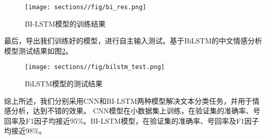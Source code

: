 \begin{figure}[H]
    \centering
    \texttt{[image: sections//fig/bi\_res.png]}
    \caption{BI-LSTM模型的训练结果}
    \label{fig:bires}
\end{figure}

最后，导出我们训练好的模型，进行自主输入测试。基于BiLSTM的中文情感分析模型测试结果如图\ref{fig:bilstm_test}。

\begin{figure}[H]
    \centering
    \texttt{[image: sections//fig/bilstm\_test.png]}
    \caption{BiLSTM模型的测试结果}
    \label{fig:bilstm_test}
\end{figure}

\vspace{2em}

综上所述，我们分别采用CNN和BI-LSTM两种模型解决文本分类任务，并用于情感分析，达到不错的效果。 CNN模型在小数据集上训练，在验证集的准确率、号回率及F1因子均接近95\%。BI-LSTM模型，在验证集的准确率、号回率及F1因子均接近98\%。
